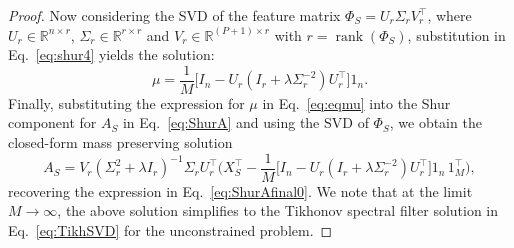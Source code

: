 \documentclass{article}
\begin{document}
\begin{proof}
Now considering the SVD of the feature matrix $\Phi_S=U_r\Sigma_r V^{\top}_r$, where $U_r \in \mathbb{R}^{n\times r}$, $\Sigma_r\in \mathbb{R}^{r \times r}$ and $V_r \in \mathbb{R}^{(P+1)\times r}$ with $r=\operatorname{rank}(\Phi_S)$, substitution in Eq.~\eqref{eq:shur4} yields the solution:
\begin{equation}
    \mu =\frac{1}{M}\big[I_n-U_r(I_r + \lambda \Sigma_r^{-2})U_r^{\top}\big]1_n.
    \label{eq:eqmu}
\end{equation}
Finally, substituting the expression for $\mu$ in Eq.~\eqref{eq:eqmu} into the Shur component for $A_S$ in Eq.~\eqref{eq:ShurA} and using the SVD of $\Phi_S$, we obtain the closed-form mass preserving solution
\begin{equation}
A_S=V_r(\Sigma^2_r+\lambda I_r)^{-1}\Sigma_r U^{\top}_r\big(X^{\top}_S-\frac{1}{M}\big[I_n-U_r(I_r + \lambda \Sigma^{-2}_r)U^{\top}_r\big]1_n\,1_M^\top\big),
    \label{eq:ShurAfinal}
\end{equation}
recovering the expression in Eq.~\eqref{eq:ShurAfinal0}. We note that at the limit $M\to \infty$, the above solution simplifies to the Tikhonov spectral filter solution in Eq.~\eqref{eq:TikhSVD} for the unconstrained problem.


\end{proof}
\end{document}
